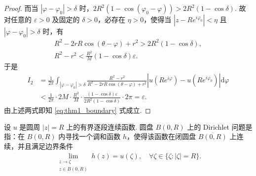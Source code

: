 \documentclass[../../main.tex]{subfiles}%
\begin{document}
\begin{proof}
而当 \(|\varphi-\varphi_0|>\delta\) 时，\(2R^2(1 - \cos(\varphi_0-\varphi)) > 2R^2(1 - \cos\delta)\). 故对任意的 \(\varepsilon>0\) 及固定的 \(\delta>0\)，必存在 \(\eta>0\)，使得当 \(|z-Re^{i\varphi_0}|<\eta\) 且 \(|\varphi-\varphi_0|>\delta\) 时，有
\begin{gather*}
R^2 - 2rR\cos(\theta-\varphi) + r^2 > 2R^2(1-\cos\delta), \\
R^2 - r^2 < \frac{R^2}{M}(1-\cos\delta)\varepsilon.
\end{gather*}
于是
\begin{align*}
I_2 &= \frac{1}{2\pi} \int_{|\varphi-\varphi_0|>\delta} \frac{R^2 - r^2}{R^2 - 2rR\cos(\theta-\varphi) + r^2} |u(Re^{i\varphi}) - u(Re^{i\varphi_0})| \mathrm{d}\varphi \\
&< \frac{1}{2\pi} \cdot 2M \cdot \frac{R^2}{M} \cdot \frac{(1-\cos\delta)\varepsilon}{2R^2(1-\cos\delta)} \cdot 2\pi = \varepsilon.
\end{align*}
由上述两式即知 \eqref{eq:thm1_boundary} 式成立.
\end{proof}

\begin{definition}\label{definition:dirichlet_disk}
设 \(u\) 是圆周 \(|z|=R\) 上的有界逐段连续函数. 圆盘 \(B(0,R)\) 上的 Dirichlet 问题是指：在 \(B(0,R)\) 内寻找一个调和函数 \(h\)，使得该函数在闭圆盘 \(\overline{B(0,R)}\) 上连续，并且满足边界条件
\begin{align*}
\lim\limits_{\substack{z\to \zeta \\ z\in B(0,R)}} h(z) = u(\zeta), \quad \forall \zeta\in \{\zeta: |\zeta|=R\}.
\end{align*}
\end{definition}
\end{document}
